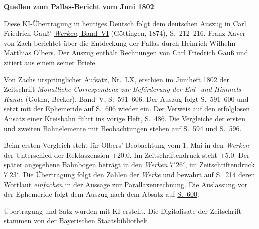 \clearpage\thispagestyle{empty}
\begin{center}\textbf{Quellen zum Pallas-Bericht vom Juni 1802}\end{center}
\noindent Diese KI-Übertragung in heutiges Deutsch folgt dem deutschen Auszug in Carl Friedrich Gauß’ \href{https://gdz.sub.uni-goettingen.de/id/PPN236007467}{\textit{Werken}, Band~VI} (Göttingen, 1874), S.~212--216. Franz Xaver von Zach berichtet über die Entdeckung der Pallas durch Heinrich Wilhelm Matthias Olbers. Der Auszug enthält Rechnungen von Carl Friedrich Gauß und zitiert aus einem seiner Briefe.
\par\smallskip\noindent Von Zachs \href{https://api.digitale-sammlungen.de/iiif/image/v2/bsb10538597_00607/full/1450,/0/default.jpg}{ursprünglicher Aufsatz}, Nr.~LX, erschien im Juniheft 1802 der Zeitschrift \textit{Monatliche Correspondenz zur Beförderung der Erd- und Himmels-Kunde} (Gotha, Becker), Band~V, S.~591--606. Der Auszug folgt S.~591--600 und setzt mit der \href{https://api.digitale-sammlungen.de/iiif/image/v2/bsb10538597_00624/full/1450,/0/default.jpg}{Ephemeride auf S.~606} wieder ein. Der Verweis auf den erfolglosen Ansatz einer Kreisbahn führt ins \href{https://api.digitale-sammlungen.de/iiif/image/v2/bsb10538597_00498/full/1450,/0/default.jpg}{vorige Heft, S.~486}. Die Vergleiche der ersten und zweiten Bahnelemente mit Beobachtungen stehen auf \href{https://api.digitale-sammlungen.de/iiif/image/v2/bsb10538597_00610/full/1450,/0/default.jpg}{S.~594} und \href{https://api.digitale-sammlungen.de/iiif/image/v2/bsb10538597_00614/full/1450,/0/default.jpg}{S.~596}.
\par\smallskip\noindent Beim ersten Vergleich steht für Olbers’ Beobachtung vom 1. Mai in den \textit{Werken} der Unterschied der Rektaszension \(+20.0\). Im Zeitschriftendruck steht \(+5.0\). Der später angegebene Bahnbogen beträgt in den \textit{Werken} \(7^\circ 26'\), im \href{https://api.digitale-sammlungen.de/iiif/image/v2/bsb10538597_00611/full/1450,/0/default.jpg}{Zeitschriftendruck} \(7^\circ 23'\). Die Übertragung folgt den Zahlen der \textit{Werke} und bewahrt auf S.~214 deren Wortlaut \textit{einfachen} in der Aussage zur Parallaxenrechnung. Die Auslassung vor der Ephemeride folgt dem Auszug nach dem Absatz auf \href{https://api.digitale-sammlungen.de/iiif/image/v2/bsb10538597_00618/full/1450,/0/default.jpg}{S.~600}.
\par\smallskip\noindent Übertragung und Satz wurden mit KI erstellt. Die Digitalisate der Zeitschrift stammen von der Bayerischen Staatsbibliothek.
\clearpage
